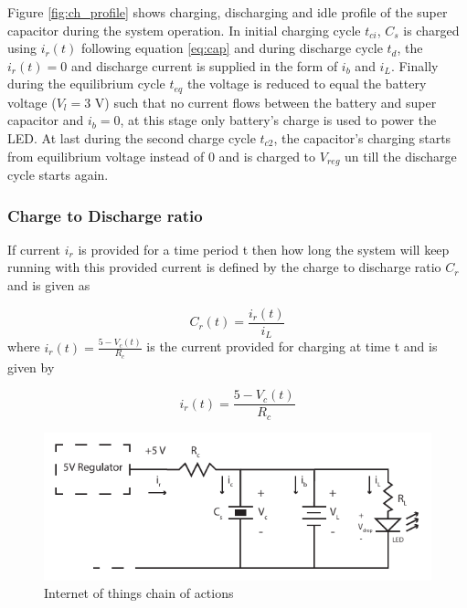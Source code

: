 Figure \ref{fig:ch_profile} shows charging, discharging and idle profile of the super capacitor during the system operation. In initial charging cycle $t_{ci}$, $C_s$ is charged using $i_r(t)$ following equation \ref{eq:cap} and during discharge cycle $t_d$, the $i_r(t) = 0$ and discharge current is supplied in the form of $i_b$ and $i_L$. Finally during the equilibrium cycle $t_{eq}$ the voltage is reduced to equal the battery voltage ($V_l = 3$ V) such that no current flows between the battery and super capacitor and $i_b = 0$, at this stage only battery's charge is used to power the LED. At last during the second charge cycle $t_{c2}$, the capacitor's charging starts from equilibrium voltage instead of 0 and is charged to $V_{reg}$ un till the discharge cycle starts again.





\subsubsection{Charge to Discharge ratio}
If current $i_r$ is provided for a time period t then how long the system will keep running with this provided current is defined by the charge to discharge ratio $C_r$ and is given as

\begin{equation}\label{eq:cdr}
 C_r(t) = \frac{i_r(t)}{i_L}
\end{equation}
where $i_r(t) = \frac {5-V_c(t)}{R_c}$ is the current provided for charging at time t and is given by

\begin{equation}\label{eq:ir}
 i_r(t) = \frac {5-V_c(t)}{R_c}
\end{equation}





\begin{figure}[h!]
\centering
\includegraphics[width=1\textwidth]{rec_design.pdf}
\caption{Internet of things chain of actions}
\label{fig:cr}
\end{figure}

